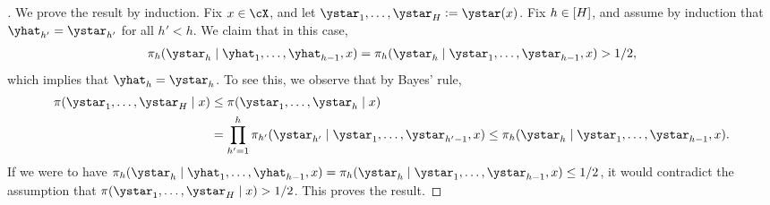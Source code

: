 
\begin{proof}[]
  We prove the result by induction. Fix $x\in\cX$, and let
  $\ystar_1,\ldots,\ystar_H\ldef{}\ystar(x)$. Fix $h\in[H]$, and
  assume by induction that $\yhat_{h'}=\ystar_{h'}$ for all $h'<h$. We
  claim that in this case,
  \begin{align}
    \pi_h(\ystar_h\mid{}\yhat_{1},\ldots,\yhat_{h-1},x)
    = \pi_h(\ystar_h\mid{}\ystar_{1},\ldots,\ystar_{h-1},x)>1/2, 
  \end{align}
  which implies that $\yhat_h=\ystar_h$. To see this, we observe that
  by Bayes' rule,
  \begin{align}
    \label{eq:4}
    \pi(\ystar_1,\ldots,\ystar_H\mid{}x)
    &\leq{}     \pi(\ystar_1,\ldots,\ystar_h\mid{}x)\\
    &=\prod_{h'=1}^{h}\pi_{h'}(\ystar_{h'}\mid{}\ystar_1,\ldots,\ystar_{h'-1},x)
    \leq{}\pi_h(\ystar_h\mid{}\ystar_{1},\ldots,\ystar_{h-1},x).
  \end{align}
  If we were to have
  $\pi_h(\ystar_h\mid{}\yhat_{1},\ldots,\yhat_{h-1},x)=\pi_h(\ystar_h\mid{}\ystar_{1},\ldots,\ystar_{h-1},x)\leq{}1/2$,
  it would contradict the assumption that
  $\pi(\ystar_1,\ldots,\ystar_H\mid{}x)>1/2$. This proves the result.
  \end{proof}


